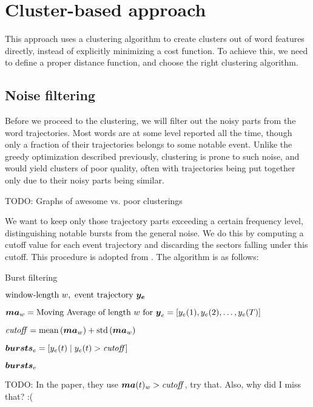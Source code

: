 \section{Cluster-based approach}
This approach uses a clustering algorithm to create clusters out of word features directly, instead of explicitly minimizing a cost function. To achieve this, we need to define a proper distance function, and choose the right clustering algorithm.

\subsection{Noise filtering}
Before we proceed to the clustering, we will filter out the noisy parts from the word trajectories. Most words are at some level reported all the time, though only a fraction of their trajectories belongs to some notable event. Unlike the greedy optimization described previously, clustering is prone to such noise, and would yield clusters of poor quality, often with trajectories being put together only due to their noisy parts being similar.

{\color{red} TODO: Graphs of awesome vs. poor clusterings}

We want to keep only those trajectory parts exceeding a certain frequency level, distinguishing notable bursts from the general noise. We do this by computing a cutoff value for each event trajectory and discarding the sectors falling under this cutoff. This procedure is adopted from \cite{online-search-queries}. The algorithm is as follows:

\begin{algorithm}[H]
\begin{algorithmic}[1]
\caption{Burst filtering}
\Input $\text{window-length} \ w,\ \text{event trajectory} \ \vect{\traj_{e}}$

\State $\vect{MA}_{w} = \text{Moving Average of length} ~ w ~ \text{for} ~ \vect{\traj}_{e} = \left[ \traj_{e}(1), \traj_{e}(2), \dots, \traj_{e}(\streamlen) \right]$

\State $\mathit{cutoff} = \text{mean} \left( \vect{MA}_{w} \right) + \text{std} \left( \vect{MA}_{w} \right)$

\State $\vect{bursts}_{e} = \left[ \traj_{e}(t) \mid \traj_{e}(t) > \mathit{cutoff} \right]$

\Output $\vect{bursts}_{e}$
\end{algorithmic}
\end{algorithm}

{\color{red} TODO: In the paper, they use $\vect{MA}(t)_{w} > \mathit{cutoff}$, try that. Also, why did I miss that? :(}


